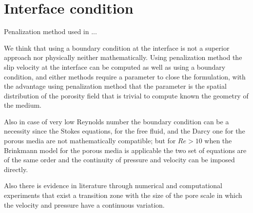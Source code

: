 \section{Interface condition}

Penalization method \citet{angot1999penalization} used in\cite{bruneau2004passive} \cite{bruneau2008numerical} \cite{bruneau2010coupling}...


We think that using a boundary condition at the interface is not a superior approach nor physically neither mathematically.
Using penalization method the slip velocity at the interface can be computed as well as using a boundary condition, and either methods require a parameter to close the formulation, with the advantage using penalization method that the parameter is the spatial distribution of the porosity field that is trivial to compute known the geometry of the medium.

Also in case of very low Reynolds number the boundary condition can be a necessity since the Stokes equations, for the free fluid, and the Darcy one for the porous media are not mathematically compatible; but for $Re>10$ when the Brinkmann model for the porous media is applicable the two set of equations are of the same order and the continuity of pressure and velocity can be imposed directly.

Also there is evidence in literature through numerical and computational experiments \citet{ochoa2017fluid} that exist a transition zone with the size of the pore scale in which the velocity and pressure have a continuous variation.
